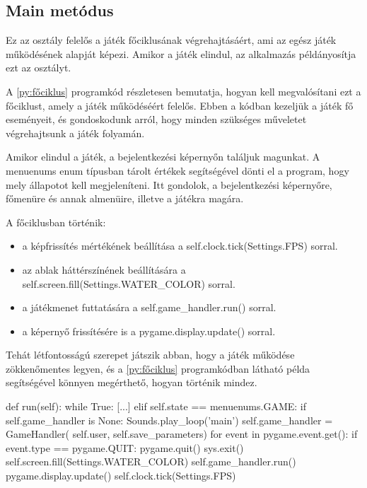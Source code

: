 \subsection{Main metódus}
 Ez az osztály felelős a játék főciklusának végrehajtásáért, ami az egész játék működésének alapját képezi. Amikor a játék elindul, az alkalmazás példányosítja ezt az osztályt.

A \ref{py:főciklus} programkód részletesen bemutatja, hogyan kell megvalósítani ezt a főciklust, amely a játék működéséért felelős. Ebben a kódban kezeljük a játék fő eseményeit, és gondoskodunk arról, hogy minden szükséges műveletet végrehajtsunk a játék folyamán.

Amikor elindul a játék, a bejelentkezési képernyőn találjuk magunkat. A menuenums enum típusban tárolt értékek segítségével dönti el a program, hogy mely állapotot kell megjeleníteni. Itt gondolok, a bejelentkezési képernyőre, főmenüre és annak almenüire, illetve a játékra magára. 

A főciklusban történik:
\begin {itemize}
\item a képfrissítés mértékének beállítása a self.clock.tick(Settings.FPS) sorral.
\item az ablak háttérszínének beállítására a self.screen.fill(Settings.WATER\_COLOR) sorral.
\item  a játékmenet futtatására a self.game\_handler.run() sorral.
\item a képernyő frissítésére is a pygame.display.update() sorral.
\end {itemize}


Tehát létfontosságú szerepet játszik abban, hogy a játék működése zökkenőmentes legyen, és a \ref{py:főciklus} programkódban látható példa segítségével könnyen megérthető, hogyan történik mindez.


\begin{python}[caption={Játék főciklusa},label=py:főciklus]
    def run(self):
        while True:
            [...]
            elif self.state == menuenums.GAME:
                if self.game_handler is None:
                    Sounds.play_loop('main')
                    self.game_handler = GameHandler(
                        self.user, self.save_parameters)
                for event in pygame.event.get():
                    if event.type == pygame.QUIT:
                        pygame.quit()
                        sys.exit()
                self.screen.fill(Settings.WATER_COLOR)
                self.game_handler.run()
                pygame.display.update()
                self.clock.tick(Settings.FPS)
\end{python}


